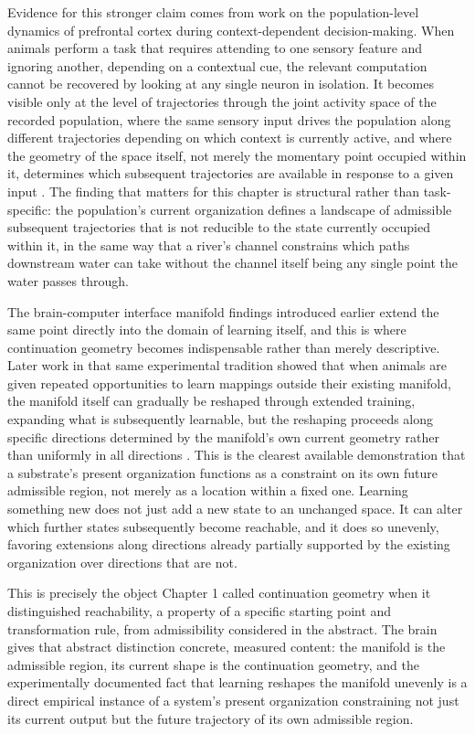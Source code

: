 \documentclass[11pt]{book}
\begin{document}
Evidence for this stronger claim comes from work on the population-level dynamics of prefrontal cortex during context-dependent decision-making. When animals perform a task that requires attending to one sensory feature and ignoring another, depending on a contextual cue, the relevant computation cannot be recovered by looking at any single neuron in isolation. It becomes visible only at the level of trajectories through the joint activity space of the recorded population, where the same sensory input drives the population along different trajectories depending on which context is currently active, and where the geometry of the space itself, not merely the momentary point occupied within it, determines which subsequent trajectories are available in response to a given input \cite{mante2013}. The finding that matters for this chapter is structural rather than task-specific: the population's current organization defines a landscape of admissible subsequent trajectories that is not reducible to the state currently occupied within it, in the same way that a river's channel constrains which paths downstream water can take without the channel itself being any single point the water passes through.

The brain-computer interface manifold findings introduced earlier extend the same point directly into the domain of learning itself, and this is where continuation geometry becomes indispensable rather than merely descriptive. Later work in that same experimental tradition showed that when animals are given repeated opportunities to learn mappings outside their existing manifold, the manifold itself can gradually be reshaped through extended training, expanding what is subsequently learnable, but the reshaping proceeds along specific directions determined by the manifold's own current geometry rather than uniformly in all directions \cite{golub2018}. This is the clearest available demonstration that a substrate's present organization functions as a constraint on its own future admissible region, not merely as a location within a fixed one. Learning something new does not just add a new state to an unchanged space. It can alter which further states subsequently become reachable, and it does so unevenly, favoring extensions along directions already partially supported by the existing organization over directions that are not.

This is precisely the object Chapter 1 called continuation geometry when it distinguished reachability, a property of a specific starting point and transformation rule, from admissibility considered in the abstract. The brain gives that abstract distinction concrete, measured content: the manifold is the admissible region, its current shape is the continuation geometry, and the experimentally documented fact that learning reshapes the manifold unevenly is a direct empirical instance of a system's present organization constraining not just its current output but the future trajectory of its own admissible region.
\end{document}
